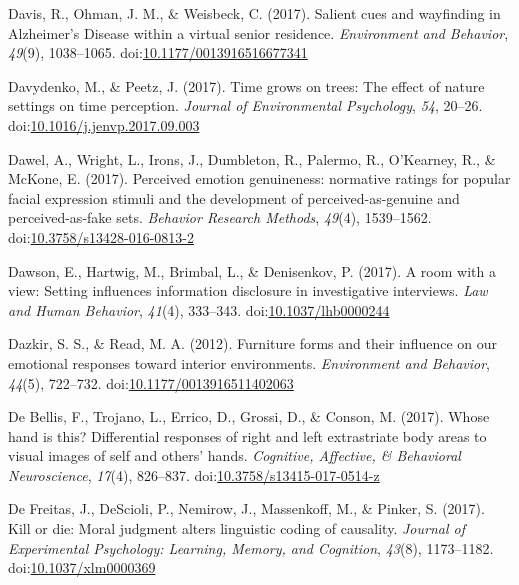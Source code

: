 \documentclass[english,man]{apa6}
\begin{document}
\hypertarget{ref-Davis2017}{}
Davis, R., Ohman, J. M., \& Weisbeck, C. (2017). Salient cues and
wayfinding in Alzheimer's Disease within a virtual senior residence.
\emph{Environment and Behavior}, \emph{49}(9), 1038--1065.
doi:\href{https://doi.org/10.1177/0013916516677341}{10.1177/0013916516677341}

\hypertarget{ref-Davydenko2017}{}
Davydenko, M., \& Peetz, J. (2017). Time grows on trees: The effect of
nature settings on time perception. \emph{Journal of Environmental
Psychology}, \emph{54}, 20--26.
doi:\href{https://doi.org/10.1016/j.jenvp.2017.09.003}{10.1016/j.jenvp.2017.09.003}

\hypertarget{ref-Dawel2017}{}
Dawel, A., Wright, L., Irons, J., Dumbleton, R., Palermo, R., O'Kearney,
R., \& McKone, E. (2017). Perceived emotion genuineness: normative
ratings for popular facial expression stimuli and the development of
perceived-as-genuine and perceived-as-fake sets. \emph{Behavior Research
Methods}, \emph{49}(4), 1539--1562.
doi:\href{https://doi.org/10.3758/s13428-016-0813-2}{10.3758/s13428-016-0813-2}

\hypertarget{ref-Dawson2017}{}
Dawson, E., Hartwig, M., Brimbal, L., \& Denisenkov, P. (2017). A room
with a view: Setting influences information disclosure in investigative
interviews. \emph{Law and Human Behavior}, \emph{41}(4), 333--343.
doi:\href{https://doi.org/10.1037/lhb0000244}{10.1037/lhb0000244}

\hypertarget{ref-Dazkir2012}{}
Dazkir, S. S., \& Read, M. A. (2012). Furniture forms and their
influence on our emotional responses toward interior environments.
\emph{Environment and Behavior}, \emph{44}(5), 722--732.
doi:\href{https://doi.org/10.1177/0013916511402063}{10.1177/0013916511402063}

\hypertarget{ref-DeBellis2017}{}
De Bellis, F., Trojano, L., Errico, D., Grossi, D., \& Conson, M.
(2017). Whose hand is this? Differential responses of right and left
extrastriate body areas to visual images of self and others' hands.
\emph{Cognitive, Affective, \& Behavioral Neuroscience}, \emph{17}(4),
826--837.
doi:\href{https://doi.org/10.3758/s13415-017-0514-z}{10.3758/s13415-017-0514-z}

\hypertarget{ref-DeFreitas2017}{}
De Freitas, J., DeScioli, P., Nemirow, J., Massenkoff, M., \& Pinker, S.
(2017). Kill or die: Moral judgment alters linguistic coding of
causality. \emph{Journal of Experimental Psychology: Learning, Memory,
and Cognition}, \emph{43}(8), 1173--1182.
doi:\href{https://doi.org/10.1037/xlm0000369}{10.1037/xlm0000369}
\end{document}
